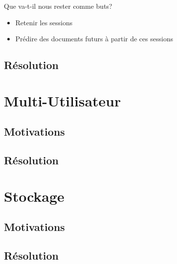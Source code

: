             Que va-t-il nous rester comme buts?
            \begin{itemize}
                \item Retenir les sessions
                \item Prédire des documents futurs à partir de ces sessions
            \end{itemize}
        \subsection{Résolution}
    \section{Multi-Utilisateur}
        \subsection{Motivations}
        \subsection{Résolution}
    \section{Stockage}
        \subsection{Motivations}
        \subsection{Résolution}
